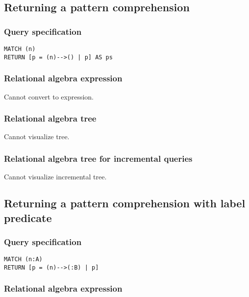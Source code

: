\subsection{Returning a pattern comprehension}

\subsubsection*{Query specification}

\begin{lstlisting}
MATCH (n)
RETURN [p = (n)-->() | p] AS ps
\end{lstlisting}

\subsubsection*{Relational algebra expression}

Cannot convert to expression.

\subsubsection*{Relational algebra tree}

Cannot visualize tree.

\subsubsection*{Relational algebra tree for incremental queries}

Cannot visualize incremental tree.

\subsection{Returning a pattern comprehension with label predicate}

\subsubsection*{Query specification}

\begin{lstlisting}
MATCH (n:A)
RETURN [p = (n)-->(:B) | p]
\end{lstlisting}

\subsubsection*{Relational algebra expression}

